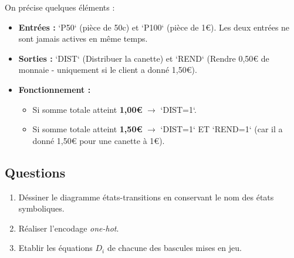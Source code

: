 \documentclass[a4paper,11pt]{article}
\begin{document}
On précise quelques éléments :
\begin{itemize}
    \item \textbf{Entrées :} `P50` (pièce de 50c) et `P100` (pièce de 1€). Les deux entrées ne sont jamais actives en même temps.
    \item \textbf{Sorties :} `DIST` (Distribuer la canette) et `REND` (Rendre 0,50€ de monnaie - uniquement si le client a donné 1,50€).
    \item \textbf{Fonctionnement :}
    \begin{itemize}
        \item Si somme totale atteint \textbf{1,00€} $\rightarrow$ `DIST=1`.
        \item Si somme totale atteint \textbf{1,50€} $\rightarrow$ `DIST=1` ET `REND=1` (car il a donné 1,50€ pour une canette à 1€).
    \end{itemize}
\end{itemize}

\vspace{0.5cm}
\subsection*{Questions}

\begin{enumerate}
  \item Déssiner le diagramme états-transitions en conservant le nom des états symboliques.
  \item Réaliser l'encodage \textit{one-hot}.
  \item Etablir les équations $D_i$ de chacune des bascules mises en jeu.
\end{enumerate}
\end{document}
